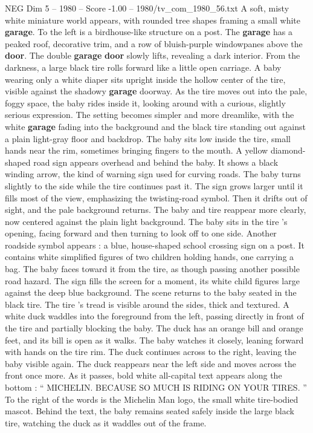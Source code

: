 \begin{textsample}{NEG Dim 5 – 1980 – Score -1.00 – 1980/tv\_com\_1980\_56.txt}  \label{ex:f5_neg_065}
A soft, misty white miniature world appears, with rounded tree shapes framing a small white \textbf{garage}.
To the left is a birdhouse-like structure on a post.
The \textbf{garage} has a peaked roof, decorative trim, and a row of bluish-purple windowpanes above the \textbf{door}.
The double \textbf{garage} \textbf{door} slowly lifts, revealing a dark interior.
From the darkness, a large black tire rolls forward like a little open carriage.
A baby wearing only a white diaper sits upright inside the hollow center of the tire, visible against the shadowy \textbf{garage} doorway.
As the tire moves out into the pale, foggy space, the baby rides inside it, looking around with a curious, slightly serious expression.
The setting becomes simpler and more dreamlike, with the white \textbf{garage} fading into the background and the black tire standing out against a plain light-gray floor and backdrop.
The baby sits low inside the tire, small hands near the rim, sometimes bringing fingers to the mouth.
A yellow diamond-shaped road sign appears overhead and behind the baby.
It shows a black winding arrow, the kind of warning sign used for curving roads.
The baby turns slightly to the side while the tire continues past it.
The sign grows larger until it fills most of the view, emphasizing the twisting-road symbol.
Then it drifts out of sight, and the pale background returns.
The baby and tire reappear more clearly, now centered against the plain light background.
The baby sits in the tire ’s opening, facing forward and then turning to look off to one side.
Another roadside symbol appears : a blue, house-shaped school crossing sign on a post.
It contains white simplified figures of two children holding hands, one carrying a bag.
The baby faces toward it from the tire, as though passing another possible road hazard.
The sign fills the screen for a moment, its white child figures large against the deep blue background.
The scene returns to the baby seated in the black tire.
The tire ’s tread is visible around the sides, thick and textured.
A white duck waddles into the foreground from the left, passing directly in front of the tire and partially blocking the baby.
The duck has an orange bill and orange feet, and its bill is open as it walks.
The baby watches it closely, leaning forward with hands on the tire rim.
The duck continues across to the right, leaving the baby visible again.
The duck reappears near the left side and moves across the front once more.
As it passes, bold white all-capital text appears along the bottom : “ MICHELIN.
BECAUSE SO MUCH IS RIDING ON YOUR TIRES. ” To the right of the words is the Michelin Man logo, the small white tire-bodied mascot.
Behind the text, the baby remains seated safely inside the large black tire, watching the duck as it waddles out of the frame.

\end{textsample}
